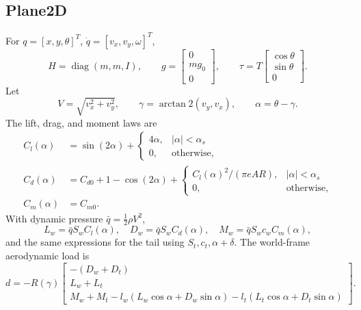 \documentclass[11pt]{article}
\newcommand{\diag}{\operatorname{diag}}
\begin{document}
\subsection{Plane2D}
For \(q=[x,y,\theta]^T\), \(\dot q=[v_x,v_y,\omega]^T\),
\begin{equation}
    H=\diag(m,m,I),
    \qquad
    g=\begin{bmatrix}0\\mg_0\\0\end{bmatrix},
    \qquad
    \tau=T\begin{bmatrix}\cos\theta\\\sin\theta\\0\end{bmatrix}.
\end{equation}
Let
\begin{equation}
    V=\sqrt{v_x^2+v_y^2},
    \qquad
    \gamma=\arctan2(v_y,v_x),
    \qquad
    \alpha=\theta-\gamma.
\end{equation}
The lift, drag, and moment laws are
\begin{align}
    C_l(\alpha) &= \sin(2\alpha) + \begin{cases}4\alpha,&|\alpha|<\alpha_s\\0,&\text{otherwise,}\end{cases}\\
    C_d(\alpha) &= C_{d0} + 1-\cos(2\alpha)
      + \begin{cases}C_l(\alpha)^2/(\pi e AR),&|\alpha|<\alpha_s\\0,&\text{otherwise,}\end{cases}\\
    C_m(\alpha) &= C_{m0}.
\end{align}
With dynamic pressure \(\bar q=\frac{1}{2}\rho V^2\),
\begin{equation}
    L_w=\bar qS_wC_l(\alpha),\quad
    D_w=\bar qS_wC_d(\alpha),\quad
    M_w=\bar qS_wc_wC_m(\alpha),
\end{equation}
and the same expressions for the tail using \(S_t,c_t,\alpha+\delta\).  The
world-frame aerodynamic load is
\begin{equation}
    d =
    -R(\gamma)
    \begin{bmatrix}
        -(D_w+D_t)\\
        L_w+L_t\\
        M_w+M_t-l_w(L_w\cos\alpha+D_w\sin\alpha)
            -l_t(L_t\cos\alpha+D_t\sin\alpha)
    \end{bmatrix}.
\end{equation}
\end{document}
